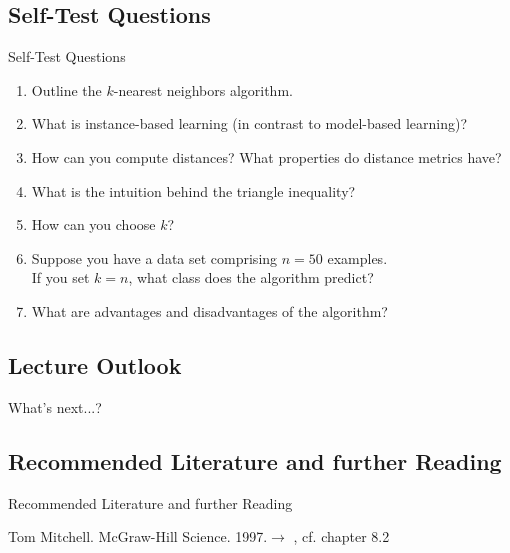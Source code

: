 \subsection{Self-Test Questions}

\begin{frame}{Self-Test Questions}{}\important
	\begin{enumerate}
		\item Outline the $k$-nearest neighbors algorithm.
		\item What is instance-based learning (in contrast to model-based learning)?
		\item How can you compute distances? What properties do distance metrics have?
		\item What is the intuition behind the triangle inequality?
		\item How can you choose $k$?
		\item Suppose you have a data set comprising $n = 50$ examples. \\
			If you set $k = n$, what class does the algorithm predict?
		\item What are advantages and disadvantages of the algorithm?
	\end{enumerate}
\end{frame}


\subsection{Lecture Outlook}

\begin{frame}{What's next...?}{}
\end{frame}


\subsection{Recommended Literature and further Reading}

\begin{frame}[allowframebreaks]{Recommended Literature and further Reading}{}
	\footnotesize
	\begin{thebibliography}{2}
			{Tom Mitchell. McGraw-Hill Science. 1997.}{$\rightarrow$ \href{
				https://www.cs.ubbcluj.ro/~gabis/ml/ml-books/McGrawHill\%20-\%20Machine\%20Learning\%20-Tom\%20Mitchell.pdf
			}{}, cf. chapter 8.2}
	\end{thebibliography}
\end{frame}


